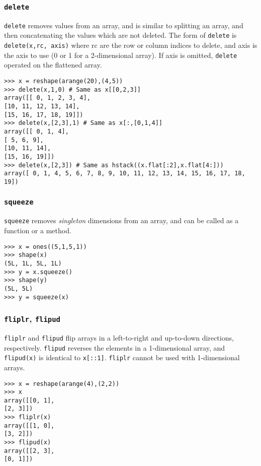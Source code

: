 \documentclass[KSmain.tex]{subfiles}
\begin{document}
\subsubsection{\texttt{delete}}
\texttt{delete} removes values from an array, and is similar to splitting an array, and then concatenating the values
which are not deleted. The form of \texttt{delete} is \texttt{delete(x,rc, axis)} where rc are the row or column indices to
delete, and axis is the axis to use (0 or 1 for a 2-dimensional array). If axis is omitted, \texttt{delete} operated on
the flattened array.
\begin{framed}
\begin{verbatim}
>>> x = reshape(arange(20),(4,5))
>>> delete(x,1,0) # Same as x[[0,2,3]]
array([[ 0, 1, 2, 3, 4],
[10, 11, 12, 13, 14],
[15, 16, 17, 18, 19]])
>>> delete(x,[2,3],1) # Same as x[:,[0,1,4]]
array([[ 0, 1, 4],
[ 5, 6, 9],
[10, 11, 14],
[15, 16, 19]])
>>> delete(x,[2,3]) # Same as hstack((x.flat[:2],x.flat[4:]))
array([ 0, 1, 4, 5, 6, 7, 8, 9, 10, 11, 12, 13, 14, 15, 16, 17, 18,
19])
\end{verbatim}
\end{framed}
\subsubsection{\texttt{squeeze}}
\texttt{squeeze} removes \textit{singleton} dimensions from an array, and can be called as a function or a method.
\begin{framed}
\begin{verbatim}
>>> x = ones((5,1,5,1))
>>> shape(x)
(5L, 1L, 5L, 1L)
>>> y = x.squeeze()
>>> shape(y)
(5L, 5L)
>>> y = squeeze(x)
\end{verbatim}
\end{framed}
\subsubsection{\texttt{fliplr}, \texttt{flipud}}
\texttt{fliplr} and \texttt{flipud} flip arrays in a left-to-right and up-to-down directions, respectively. \texttt{flipud} reverses
the elements in a 1-dimensional array, and \texttt{flipud(x)} is identical to \texttt{x[::1]}.
\texttt{fliplr} cannot be used with 1-dimensional arrays.
\begin{framed}
\begin{verbatim}
>>> x = reshape(arange(4),(2,2))
>>> x
array([[0, 1],
[2, 3]])
>>> fliplr(x)
array([[1, 0],
[3, 2]])
>>> flipud(x)
array([[2, 3],
[0, 1]])
\end{verbatim}
\end{framed}
\end{document}
